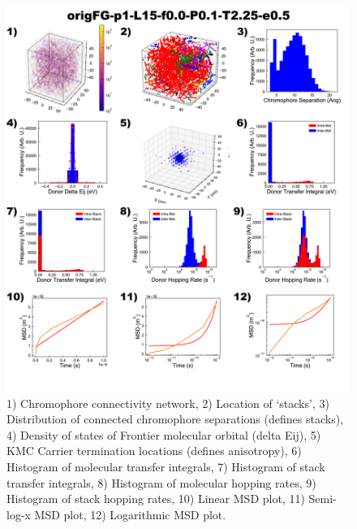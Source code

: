 \documentclass[12pt]{article}
\begin{document}
\begin{figure}[h]\centering
	\includegraphics[width=\textwidth]{Figures/origFG-p1-L15-f0.0-P0.1-T2.25-e0.5.png}
    \caption{   1) Chromophore connectivity network, 
                2) Location of `stacks', 
                3) Distribution of connected chromophore separations (defines stacks),
                4) Density of states of Frontier molecular orbital (delta Eij),
                5) KMC Carrier termination locations (defines anisotropy),
                6) Histogram of molecular transfer integrals,
                7) Histogram of stack transfer integrals,
                8) Histogram of molecular hopping rates,
                9) Histogram of stack hopping rates,
                10) Linear MSD plot,
                11) Semi-log-x MSD plot,
                12) Logarithmic MSD plot.}
	\label{fig:UneqlT2.25}
\end{figure}
\end{document}
